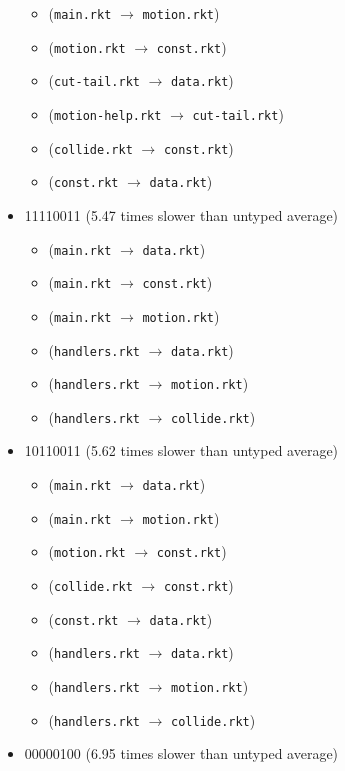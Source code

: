 \documentclass{article}
\newcommand{\mono}[1]{\texttt{#1}}
\begin{document}
\begin{itemize}
\begin{itemize}
  \item (\mono{main.rkt} $\rightarrow$ \mono{motion.rkt})
  \item (\mono{motion.rkt} $\rightarrow$ \mono{const.rkt})
  \item (\mono{cut-tail.rkt} $\rightarrow$ \mono{data.rkt})
  \item (\mono{motion-help.rkt} $\rightarrow$ \mono{cut-tail.rkt})
  \item (\mono{collide.rkt} $\rightarrow$ \mono{const.rkt})
  \item (\mono{const.rkt} $\rightarrow$ \mono{data.rkt})
  \end{itemize}
\item 11110011 (5.47 times slower than untyped average)
  \begin{itemize}
  \item (\mono{main.rkt} $\rightarrow$ \mono{data.rkt})
  \item (\mono{main.rkt} $\rightarrow$ \mono{const.rkt})
  \item (\mono{main.rkt} $\rightarrow$ \mono{motion.rkt})
  \item (\mono{handlers.rkt} $\rightarrow$ \mono{data.rkt})
  \item (\mono{handlers.rkt} $\rightarrow$ \mono{motion.rkt})
  \item (\mono{handlers.rkt} $\rightarrow$ \mono{collide.rkt})
  \end{itemize}
\item 10110011 (5.62 times slower than untyped average)
  \begin{itemize}
  \item (\mono{main.rkt} $\rightarrow$ \mono{data.rkt})
  \item (\mono{main.rkt} $\rightarrow$ \mono{motion.rkt})
  \item (\mono{motion.rkt} $\rightarrow$ \mono{const.rkt})
  \item (\mono{collide.rkt} $\rightarrow$ \mono{const.rkt})
  \item (\mono{const.rkt} $\rightarrow$ \mono{data.rkt})
  \item (\mono{handlers.rkt} $\rightarrow$ \mono{data.rkt})
  \item (\mono{handlers.rkt} $\rightarrow$ \mono{motion.rkt})
  \item (\mono{handlers.rkt} $\rightarrow$ \mono{collide.rkt})
  \end{itemize}
\item 00000100 (6.95 times slower than untyped average)
  \begin{itemize}

\end{itemize}
\end{itemize}
\end{document}
